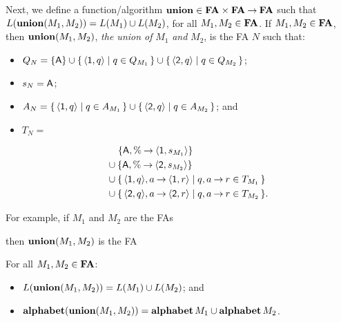 %
%
%
%
Next, we define a function/algorithm $\mathbf{union}\in\mathbf{FA}\times\mathbf{FA}\mathbin{\to}\mathbf{FA}$
such that $L(\mathbf{union}(M_1,M_2))=L(M_1)\cup L(M_2)$, for all
$M_1,M_2\in\mathbf{FA}$.  If $M_1,M_2\in\mathbf{FA}$, then $\mathbf{union}(M_1,M_2)$,
\emph{the union of} $M_1$ \emph{and} $M_2$, is the FA $N$ such that:
\begin{itemize}
\item $Q_N= \{\mathsf{A}\}\cup\{ \, \langle\mathsf{1},q\rangle \mid q\in
    Q_{M_1} \, \}\cup \{ \, \langle\mathsf{2},q\rangle \mid q\in Q_{M_2} \, \}$;

\item $s_N=\mathsf{A}$;

\item $A_N=\{ \, \langle\mathsf{1},q\rangle \mid q\in A_{M_1} \, \}\cup
  \{ \, \langle\mathsf{2},q\rangle \mid q\in A_{M_2} \, \}$; and

\item $T_N={}$

\begin{align*}
  &\quad
  \,\{\mathsf{A},\%\mathbin{\to} \langle\mathsf{1},s_{M_1}\rangle\} \\
  &\cup \{\mathsf{A},\%\mathbin{\to}\langle\mathsf{2},s_{M_2}\rangle\} \\
  &\cup \{ \, \langle\mathsf{1},q\rangle,a\mathbin{\to}\langle\mathsf{1},r\rangle \mid q,
    a\mathbin{\to} r\in T_{M_1} \, \}
  \\
  &\cup \{ \, \langle\mathsf{2},q\rangle,a\mathbin{\to}\langle\mathsf{2},r\rangle \mid q,
    a\mathbin{\to} r \in T_{M_2} \, \}.
\end{align*}
\end{itemize}

For example, if $M_1$ and $M_2$ are the FAs
\begin{center}


\end{center}
then $\mathbf{union}(M_1,M_2)$ is the FA
\begin{center}

\end{center}

\begin{proposition}
For all $M_1,M_2\in\mathbf{FA}$:
\begin{itemize}
\item $L(\mathbf{union}(M_1,M_2))=L(M_1)\cup L(M_2)$; and

\item $\mathbf{alphabet}(\mathbf{union}(M_1,M_2))=\mathbf{alphabet}\,M_1\cup\mathbf{alphabet}\,M_2$.
\end{itemize}
\end{proposition}

